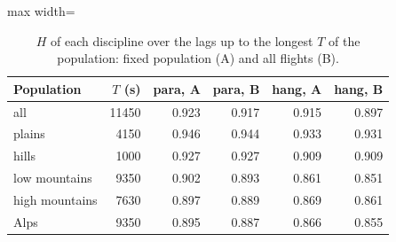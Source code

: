 \begin{table}
\centering
\small
\renewcommand{\arraystretch}{1.15}\setlength{\tabcolsep}{4pt}
\begin{adjustbox}{max width=\textwidth}
\begin{tabular}{lrrrrr}
\toprule
Population & $T$ (s) & para, A & para, B & hang, A & hang, B \\
\midrule
all & 11450 & 0.923 & 0.917 & 0.915 & 0.897 \\
plains & 4150 & 0.946 & 0.944 & 0.933 & 0.931 \\
hills & 1000 & 0.927 & 0.927 & 0.909 & 0.909 \\
low mountains & 9350 & 0.902 & 0.893 & 0.861 & 0.851 \\
high mountains & 7630 & 0.897 & 0.889 & 0.869 & 0.861 \\
Alps & 9350 & 0.895 & 0.887 & 0.866 & 0.855 \\
\bottomrule
\end{tabular}
\end{adjustbox}
\caption{$H$ of each discipline over the lags up to the longest $T$ of the population: fixed population (A) and all flights (B).}\label{tab:fixed-vs-all-H}
\end{table}
